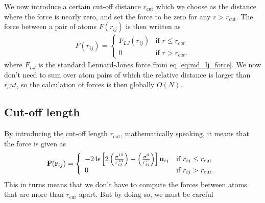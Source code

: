 We now introduce a certain cut-off distance $r_\text{cut}$ which we choose as the distance where the force is nearly zero, and set the force to be zero for any $r>r_\text{cut}$. The force between a pair of atoms $F(r_{ij})$ is then written as
\begin{align}
	F(r_{ij}) = \left\{\begin{array}{cc}
		F_{LJ}(r_{ij}) & \text{if } r \leq r_{cut}\\
		0 & \text{if } r > r_{cut}.
	\end{array}
	\right.
\end{align}
where $F_{LJ}$ is the standard Lennard-Jones force from eq \eqref{eq:md_lj_force}. We now don't need to sum over atom pairs of which the relative distance is larger than $r_cut$, so the calculation of forces is then globally $O(N)$. 
\subsection{Cut-off length}
By introducing the cut-off length $r_\text{cut}$, mathematically speaking, it means that the force is given as
\begin{align}
	\vec F(\vec r_{ij}) = \left\{
	\begin{array}{l l}
		-24\epsilon\left[2\left(\frac{\sigma^{12}}{r_{ij}^{13}}\right) - \left(\frac{\sigma^6}{r_{ij}^7}\right)\right]\vec u_{ij} & \text{if } r_{ij} \leq r_\text{cut}\\
		0 & \text{if } r_{ij} > r_\text{cut}.
	\end{array}\right .
\end{align}
This in turns means that we don't have to compute the forces between atoms that are more than $r_\text{cut}$ apart. But by doing so, we must be careful